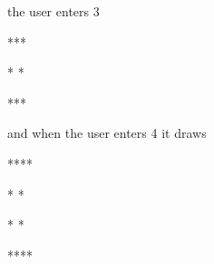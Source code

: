 the user enters 3

\begin{console}

***

* *

***

\end{console}

and when the user enters 4 it draws

\begin{console}

****

*  *

*  *

****

\end{console}

